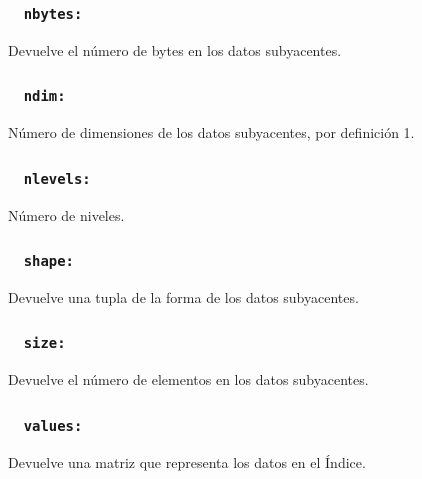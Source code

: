     \subsubsection{~\hspace{2em} \texttt{nbytes:}} Devuelve el número de bytes en los datos subyacentes.
    \subsubsection{~\hspace{2em} \texttt{ndim:}} Número de dimensiones de los datos subyacentes, por definición 1.
    \subsubsection{~\hspace{2em} \texttt{nlevels:}} Número de niveles.
    \subsubsection{~\hspace{2em} \texttt{shape:}} Devuelve una tupla de la forma de los datos subyacentes.
    \subsubsection{~\hspace{2em} \texttt{size:}} Devuelve el número de elementos en los datos subyacentes.
    \subsubsection{~\hspace{2em} \texttt{values:}} Devuelve una matriz que representa los datos en el Índice.






